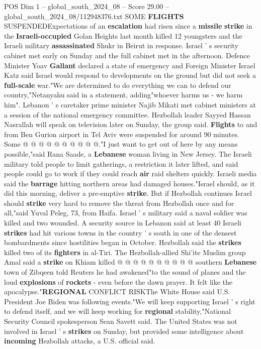 \begin{textsample}{POS Dim 1 – global\_south\_2024\_08 – Score 29.00 – global\_south\_2024\_08/112948376.txt}
SOME \textbf{FLIGHTS} SUSPENDEDExpectations of an \textbf{escalation} had risen since a \textbf{missile} \textbf{strike} in the \textbf{Israeli-occupied} Golan Heights last month killed 12 youngsters and the Israeli military \textbf{assassinated} Shukr in Beirut in response.
Israel ' s security cabinet met early on Sunday and the full cabinet met in the afternoon.
Defence Minister Yoav \textbf{Gallant} declared a state of emergency and Foreign Minister Israel Katz said Israel would respond to developments on the ground but did not seek a \textbf{full-scale} war."We are determined to do everything we can to defend our country,"Netanyahu said in a statement, adding"whoever harms us - we harm him".
Lebanon ' s caretaker prime minister Najib Mikati met cabinet ministers at a session of the national emergency committee.
Hezbollah leader Sayyed Hassan Nasrallah will speak on television later on Sunday, the group said. \textbf{Flights} to and from Ben Gurion airport in Tel Aviv were suspended for around 90 minutes.
Some @ @ @ @ @ @ @ @ @ @."I just want to get out of here by any means possible,"said Rana Saade, a \textbf{Lebanese} woman living in New Jersey.
The Israeli military told people to limit gatherings, a restriction it later lifted, and said people could go to work if they could reach \textbf{air} raid shelters quickly.
Israeli media said the \textbf{barrage} hitting northern areas had damaged houses."Israel should, as it did this morning, deliver a pre-emptive \textbf{strike}.
But if Hezbollah continues Israel should \textbf{strike} very hard to remove the threat from Hezbollah once and for all,"said Yuval Peleg, 73, from Haifa.
Israel ' s military said a naval soldier was killed and two wounded.
A security source in Lebanon said at least 40 Israeli \textbf{strikes} had hit various towns in the country ' s south in one of the densest bombardments since hostilities began in October.
Hezbollah said the \textbf{strikes} killed two of its \textbf{fighters} in al-Tiri.
The Hezbollah-allied Shi'ite Muslim group Amal said a \textbf{strike} on Khiam killed @ @ @ @ @ @ @ @ @ @ southern \textbf{Lebanese} town of Zibqeen told Reuters he had awakened"to the sound of planes and the loud \textbf{explosions} of \textbf{rockets} - even before the dawn prayer.
It felt like the apocalypse."\textbf{REGIONAL} CONFLICT RISKThe White House said U.S.
President Joe Biden was following events."We will keep supporting Israel ' s right to defend itself, and we will keep working for \textbf{regional} stability,"National Security Council spokesperson Sean Savett said.
The United States was not involved in Israel ' s \textbf{strikes} on Sunday, but provided some intelligence about \textbf{incoming} Hezbollah attacks, a U.S. official said.

\end{textsample}
